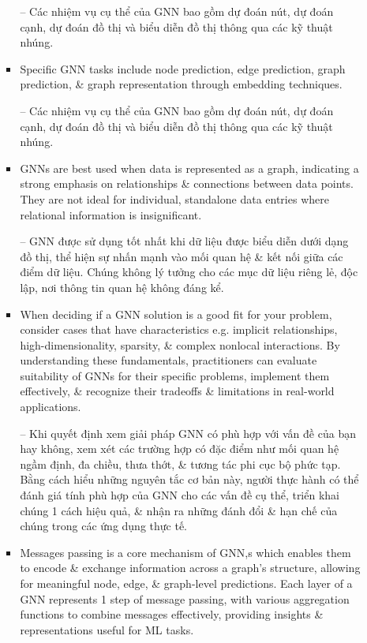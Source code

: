 \documentclass{article}
\begin{document}
\begin{itemize}
\begin{itemize}
\begin{itemize}
            -- Các nhiệm vụ cụ thể của GNN bao gồm dự đoán nút, dự đoán cạnh, dự đoán đồ thị và biểu diễn đồ thị thông qua các kỹ thuật nhúng.
            \item Specific GNN tasks include node prediction, edge prediction, graph prediction, \& graph representation through embedding techniques.

            -- Các nhiệm vụ cụ thể của GNN bao gồm dự đoán nút, dự đoán cạnh, dự đoán đồ thị và biểu diễn đồ thị thông qua các kỹ thuật nhúng.
            \item GNNs are best used when data is represented as a graph, indicating a strong emphasis on relationships \& connections between data points. They are not ideal for individual, standalone data entries where relational information is insignificant.

            -- GNN được sử dụng tốt nhất khi dữ liệu được biểu diễn dưới dạng đồ thị, thể hiện sự nhấn mạnh vào mối quan hệ \& kết nối giữa các điểm dữ liệu. Chúng không lý tưởng cho các mục dữ liệu riêng lẻ, độc lập, nơi thông tin quan hệ không đáng kể.
            \item When deciding if a GNN solution is a good fit for your problem, consider cases that have characteristics e.g. implicit relationships, high-dimensionality, sparsity, \& complex nonlocal interactions. By understanding these fundamentals, practitioners can evaluate suitability of GNNs for their specific problems, implement them effectively, \& recognize their tradeoffs \& limitations in real-world applications.

            -- Khi quyết định xem giải pháp GNN có phù hợp với vấn đề của bạn hay không, xem xét các trường hợp có đặc điểm như mối quan hệ ngầm định, đa chiều, thưa thớt, \& tương tác phi cục bộ phức tạp. Bằng cách hiểu những nguyên tắc cơ bản này, người thực hành có thể đánh giá tính phù hợp của GNN cho các vấn đề cụ thể, triển khai chúng 1 cách hiệu quả, \& nhận ra những đánh đổi \& hạn chế của chúng trong các ứng dụng thực tế.
            \item Messages passing is a core mechanism of GNN,s which enables them to encode \& exchange information across a graph's structure, allowing for meaningful node, edge, \& graph-level predictions. Each layer of a GNN represents 1 step of message passing, with various aggregation functions to combine messages effectively, providing insights \& representations useful for ML tasks.


\end{itemize}
\end{itemize}
\end{itemize}
\end{document}
